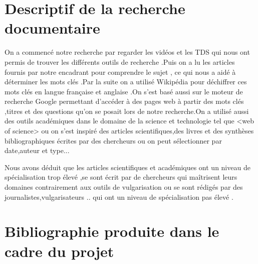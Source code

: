 \documentclass[11pt]{article}
\begin{document}
\begin{flushleft}
\section{Descriptif de la recherche documentaire}
   On a commencé notre recherche  par regarder les vidéos et les TDS  qui nous ont  permis de trouver les différents outils de recherche .Puis on a  lu  les articles fournis par notre encadrant pour  comprendre le sujet , ce qui  nous a aidé à déterminer  les mots clés .Par la suite on a utilisé Wikipédia pour déchiffrer ces mots clés  en langue française et anglaise .On s’est basé aussi sur le moteur de recherche Google permettant d’accéder à des pages web  à partir des mots clés ,titres et des questions qu’on se posait lors de notre recherche.On a utilisé aussi des outils académiques dans le domaine de la science et technologie tel que <web of science> ou on s’est inspiré des articles scientifiques,des livres et des synthèses  bibliographiques écrites par des chercheurs ou on peut sélectionner par date,auteur et type...
   
     Nous avons déduit que les articles scientifiques et académiques ont un niveau de spécialisation trop élevé ,se sont écrit par de chercheurs qui maîtrisent leurs domaines contrairement  aux outils de vulgarisation ou  se sont rédigés par des journalistes,vulgarisateurs .. qui ont un niveau de spécialisation pas élevé .


\section{Bibliographie produite dans le cadre du projet}
\end{flushleft}
\end{document}
